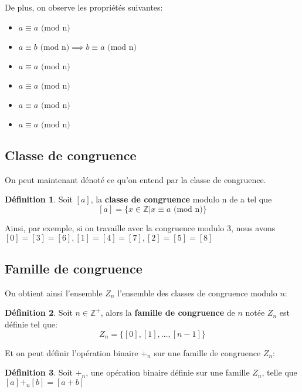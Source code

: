 \documentclass[12pt]{book}
\let\Bbb\mathbb
\theoremstyle{definition}
\newtheorem{definition}{Définition}[section]
\begin{document}
De plus, on observe les propriétés suivantes:
\begin{itemize}
    \item $a \equiv a\text{ (mod n)}$
    \item $a \equiv b\text{ (mod n)} \implies b \equiv a\text{ (mod n)}$
    \item $a \equiv a\text{ (mod n)}$
    \item $a \equiv a\text{ (mod n)}$
    \item $a \equiv a\text{ (mod n)}$
    \item $a \equiv a\text{ (mod n)}$
\end{itemize}

\subsection{Classe de congruence}

On peut maintenant dénoté ce qu'on entend par la classe de congruence.
\begin{definition}
    \label{def:classe_congruence}
    Soit $[a]$, la \textbf{classe de congruence} modulo n de a tel que 
    $$ [a] = \{ x \in \Bbb Z | x \equiv a\text{ (mod n)} \}$$
\end{definition}

Ainsi, par exemple, si on travaille avec la congruence modulo 3, nous avons $[0] = [3] = [6], [1] = [4] = [7], [2] = [5] = [8]$

\subsection{Famille de congruence}
On obtient ainsi l'ensemble $Z_n$ l'ensemble des classes de congruence modulo $n$:
\begin{definition}
    \label{def:famille_congruence}
    Soit $n \in \Bbb Z^+$, alors la \textbf{famille de congruence} de $n$ notée $Z_n$ est définie tel que:
    $$ Z_n = \{[0], [1], \dots, [n-1]\} $$
\end{definition}

Et on peut définir l'opération binaire $+_n$ sur une famille de congruence $Z_n$:
\begin{definition}
    \label{def:addition_congruence}
    Soit $+_n$, une opération binaire définie sur une famille $Z_n$, telle que $[a] +_n [b] = [a + b]$
\end{definition}
\end{document}
